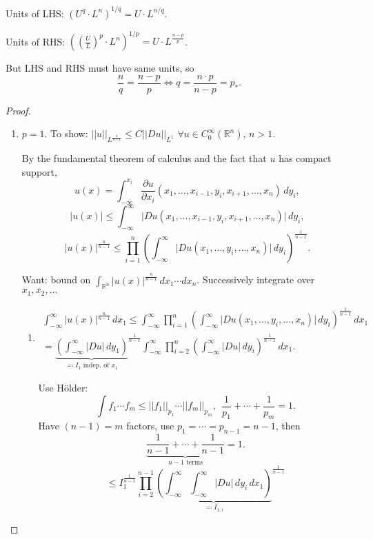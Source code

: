 \documentclass[12pt]{article}
\theoremstyle{definition}
\begin{document}
Units of LHS: $(U^q\cdot L^n)^{1/q}=U\cdot L^{n/q}$.

Units of RHS: $((\frac UL)^p\cdot L^n)^{1/p}=U\cdot L^{\frac{n-p}p}$.

But LHS and RHS must have same units, so
\begin{equation}\tag{Sobolev exponent}
\frac nq=\frac{n-p}p\Longleftrightarrow q=\frac{n\cdot p}{n-p}=p_*.
\end{equation}

\begin{proof}
\begin{enumerate}[label=\alph*)]
\item $p=1$. To show: $||u||_{L^{\frac n{n-1}}}\leq C||Du||_{L^1}$ $\forall u\in C_0^\infty(\mathbb R^n)$, $n>1$.

By the fundamental theorem of calculus and the fact that $u$ has compact support,
\[u(x)=\int_{-\infty}^{x_i}\frac{\partial u}{\partial x_i}(x_1,\ldots,x_{i-1},y_i,x_{i+1},\ldots,x_n)\,dy_i,\]
\[|u(x)|\leq\int_{-\infty}^\infty\big|Du(x_1,\ldots,x_{i-1},y_i,x_{i+1},\ldots,x_n)\big|\,dy_i,\]
\[|u(x)|^{\frac n{n-1}}\leq\prod_{i=1}^n\left(\int_{-\infty}^\infty\big|Du(x_1,\ldots,y_i,\ldots,x_n)\big|\,dy_i\right)^{\frac1{n-1}}.\]

Want: bound on $\int_{\mathbb R^n}|u(x)|^{\frac n{n-1}}\,dx_1\cdots dx_n$. Successively integrate over $x_1,x_2,\ldots$

\begin{enumerate}[label=\arabic*.]
\item
\begin{multline*}
\int_{-\infty}^\infty|u(x)|^{\frac n{n-1}}\,dx_1\leq\int_{-\infty}^\infty\prod_{i=1}^n\left(\int_{-\infty}^\infty\big|Du(x_1,\ldots,y_i,\ldots,x_n)\big|\,dy_i\right)^{\frac1{n-1}}\,dx_1\\
={\underbrace{\left(\int_{-\infty}^\infty|Du|\,dy_1\right)}_{\eqqcolon I_1\text{ indep. of }x_1}}^{\frac1{n-1}}\int_{-\infty}^\infty\prod_{i=2}^n\left(\int_{-\infty}^\infty|Du|\,dy_i\right)^{\frac1{n-1}}\,dx_1.
\end{multline*}

Use H\"older:
\[\int f_1\cdots f_m\leq||f_1||_{p_1}\cdots||f_m||_{p_m},\ \ \frac1{p_1}+\cdots+\frac1{p_m}=1.\]
Have $(n-1)=m$ factors, use $p_1=\cdots=p_{n-1}=n-1$, then
\[\underbrace{\frac1{n-1}+\cdots+\frac1{n-1}}_{n-1\text{ terms}}=1.\]
\[\leq I_1^{\frac1{n-1}}\prod_{i=2}^{n-1}{\underbrace{\left(\int_{-\infty}^\infty\int_{-\infty}^\infty|Du|\,dy_i\,dx_1\right)}_{\eqqcolon I_{1,i}}}^{\frac1{n-1}}\]


\end{enumerate}
\end{enumerate}
\end{proof}
\end{document}
